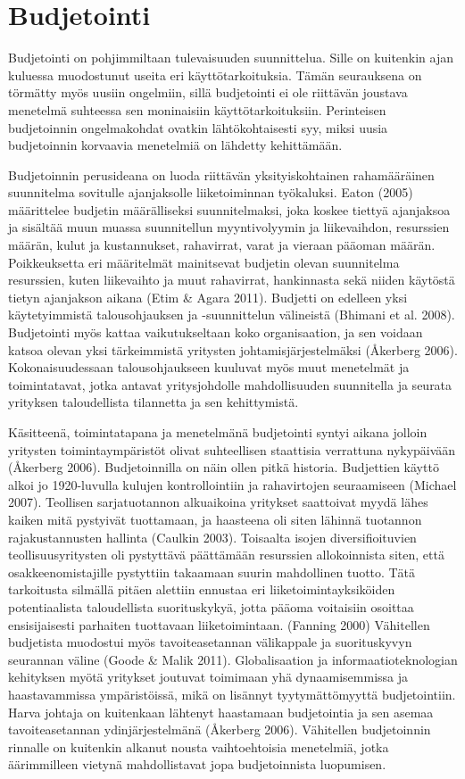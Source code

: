 \documentclass[12pt,a4paper,oneside,pdftex]{report}
\begin{document}
\section{Budjetointi}

Budjetointi on pohjimmiltaan tulevaisuuden suunnittelua. Sille on kuitenkin ajan kuluessa muodostunut useita eri käyttötarkoituksia. Tämän seurauksena on törmätty myös uusiin ongelmiin, sillä budjetointi ei ole riittävän joustava menetelmä suhteessa sen moninaisiin käyttötarkoituksiin. Perinteisen budjetoinnin ongelmakohdat ovatkin lähtökohtaisesti syy, miksi uusia budjetoinnin korvaavia menetelmiä on lähdetty kehittämään.

Budjetoinnin perusideana on luoda riittävän yksityiskohtainen rahamääräinen suunnitelma sovitulle ajanjaksolle liiketoiminnan työkaluksi. Eaton (2005) määrittelee budjetin määrälliseksi suunnitelmaksi, joka koskee tiettyä ajanjaksoa ja sisältää muun muassa suunnitellun myyntivolyymin ja liikevaihdon, resurssien määrän, kulut ja kustannukset, rahavirrat, varat ja vieraan pääoman määrän. Poikkeuksetta eri määritelmät mainitsevat budjetin olevan suunnitelma resurssien, kuten liikevaihto ja muut rahavirrat, hankinnasta sekä niiden käytöstä tietyn ajanjakson aikana (Etim & Agara 2011). Budjetti on edelleen yksi käytetyimmistä talousohjauksen ja -suunnittelun välineistä (Bhimani et al. 2008). Budjetointi myös kattaa vaikutukseltaan koko organisaation, ja sen voidaan katsoa olevan yksi tärkeimmistä yritysten johtamisjärjestelmäksi (Åkerberg 2006). Kokonaisuudessaan talousohjaukseen kuuluvat myös muut menetelmät ja toimintatavat, jotka antavat yritysjohdolle mahdollisuuden suunnitella ja seurata yrityksen taloudellista tilannetta ja sen kehittymistä.

Käsitteenä, toimintatapana ja menetelmänä budjetointi syntyi aikana jolloin yritysten toimintaympäristöt olivat suhteellisen staattisia verrattuna nykypäivään (Åkerberg 2006). Budjetoinnilla on näin ollen pitkä historia. Budjettien käyttö alkoi jo 1920-luvulla kulujen kontrollointiin ja rahavirtojen seuraamiseen (Michael 2007). Teollisen sarjatuotannon alkuaikoina yritykset saattoivat myydä lähes kaiken mitä pystyivät tuottamaan, ja haasteena oli siten lähinnä tuotannon rajakustannusten hallinta (Caulkin 2003). Toisaalta isojen diversifioituvien teollisuusyritysten oli pystyttävä päättämään resurssien allokoinnista siten, että osakkeenomistajille pystyttiin takaamaan suurin mahdollinen tuotto. Tätä tarkoitusta silmällä pitäen alettiin ennustaa eri liiketoimintayksiköiden potentiaalista taloudellista suorituskykyä, jotta pääoma voitaisiin osoittaa ensisijaisesti parhaiten tuottavaan liiketoimintaan. (Fanning 2000) Vähitellen budjetista muodostui myös tavoiteasetannan välikappale ja suorituskyvyn seurannan väline (Goode & Malik 2011). Globalisaation ja informaatioteknologian kehityksen myötä yritykset joutuvat toimimaan yhä dynaamisemmissa ja haastavammissa ympäristöissä, mikä on lisännyt tyytymättömyyttä budjetointiin. Harva johtaja on kuitenkaan lähtenyt haastamaan budjetointia ja sen asemaa tavoiteasetannan ydinjärjestelmänä (Åkerberg 2006). Vähitellen budjetoinnin rinnalle on kuitenkin alkanut nousta vaihtoehtoisia menetelmiä, jotka äärimmilleen vietynä mahdollistavat jopa budjetoinnista luopumisen.
\end{document}
